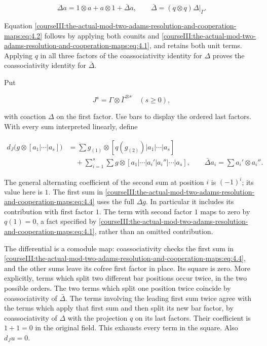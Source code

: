 \begin{equation}
\Delta a=1\otimes a+a\otimes1+\bar\Delta a,
 \qquad \bar\Delta=(q\otimes q)\Delta|_{\bar\Gamma}.
 \label{courseIII:the-actual-mod-two-adams-resolution-and-cooperation-maps:eq:4.2}
\end{equation}

Equation \eqref{courseIII:the-actual-mod-two-adams-resolution-and-cooperation-maps:eq:4.2} follows by applying both counits and \eqref{courseIII:the-actual-mod-two-adams-resolution-and-cooperation-maps:eq:4.1}, and retains both unit terms. Applying \(q\) in all three factors of the coassociativity identity for \(\Delta\) proves the coassociativity identity for \(\bar\Delta\).

Put

\begin{equation}
J^s=\Gamma\otimes\bar\Gamma^{\otimes s}\quad(s\geq0),
 \label{courseIII:the-actual-mod-two-adams-resolution-and-cooperation-maps:eq:4.3}
\end{equation}

with coaction \(\Delta\) on the first factor. Use bars to display the ordered last factors. With every sum interpreted linearly, define

\begin{equation}
\begin{aligned}
 d_J\bigl(g\otimes[a_1|\cdots|a_s]\bigr)
 &=\sum g_{(1)}\otimes[q(g_{(2)})|a_1|\cdots|a_s]\\
 &\quad+\sum_{i=1}^{s}\sum
 g\otimes[a_1|\cdots|a_i'|a_i''|\cdots|a_s],
 \qquad\bar\Delta a_i=\sum a_i'\otimes a_i''.
 \end{aligned}
 \label{courseIII:the-actual-mod-two-adams-resolution-and-cooperation-maps:eq:4.4}
\end{equation}

The general alternating coefficient of the second sum at position \(i\) is \((-1)^i\); its value here is \(1\). The first sum in \eqref{courseIII:the-actual-mod-two-adams-resolution-and-cooperation-maps:eq:4.4} uses the full \(\Delta g\). In particular it includes its contribution with first factor \(1\). The term with second factor \(1\) maps to zero by \(q(1)=0\), a fact specified by \eqref{courseIII:the-actual-mod-two-adams-resolution-and-cooperation-maps:eq:4.1}, rather than an omitted contribution.

The differential is a comodule map: coassociativity checks the first sum in \eqref{courseIII:the-actual-mod-two-adams-resolution-and-cooperation-maps:eq:4.4}, and the other sums leave its cofree first factor in place. Its square is zero. More explicitly, terms which split two different bar positions occur twice, in the two possible orders. The two terms which split one position twice coincide by coassociativity of \(\bar\Delta\). The terms involving the leading first sum twice agree with the terms which apply that first sum and then split its new bar factor, by coassociativity of \(\Delta\) with the projection \(q\) on its last factors. Their coefficient is \(1+1=0\) in the original field. This exhausts every term in the square. Also \(d_Ju=0\).

